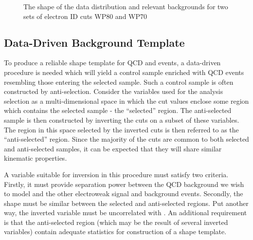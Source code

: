 \begin{figure}
\centering
{}\quad
{}
\caption[]{}
\label{fig:wpol_met_vs_mt_templates}
\end{figure}

\begin{figure}
\centering
{}\quad
{}
\caption[]{The shape of the data \LP distribution and relevant backgrounds for
  two sets of electron ID cuts  WP80 and
   WP70}
\label{fig:wpol_wp80_vs_wp70}
\end{figure}

\subsection{Data-Driven Background Template}
\label{sec:wpol_data_driven_bg}
To produce a reliable \LP shape template for \ac{QCD} and \gammajets events, a
data-driven procedure is needed which will yield a control sample enriched with
\ac{QCD} events resembling those entering the selected sample. Such a control
sample is often constructed by anti-selection. Consider the variables used for
the analysis selection as a multi-dimensional space in which the cut values
enclose some region which contains the selected sample - the ``selected''
region. The anti-selected sample is then constructed by inverting the cuts on a
subset of these variables. The region in this space selected by the inverted
cuts is then referred to as the ``anti-selected'' region. Since the majority of
the cuts are common to both selected and anti-selected samples, it can be
expected that they will share similar kinematic properties.

A variable suitable for inversion in this procedure must satisfy two
criteria. Firstly, it must provide separation power between the \ac{QCD}
background we wish to model and the other electroweak signal and background
events. Secondly, the \LP shape must be similar between the selected and
anti-selected regions. Put another way, the inverted variable must be
uncorrelated with \LP. An additional requirement is that the anti-selected
region (which may be the result of several inverted variables) contain adequate
statistics for construction of a shape template.

